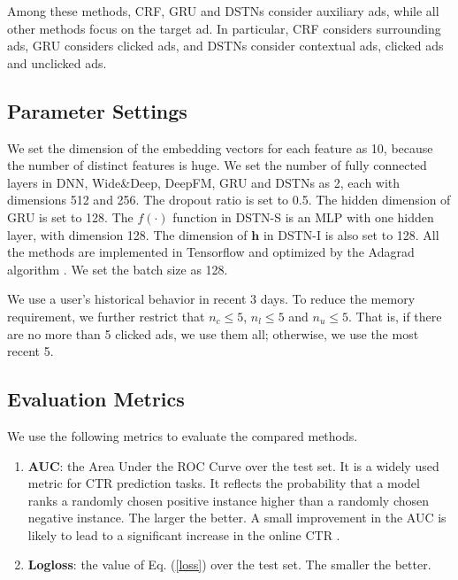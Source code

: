 \documentclass[sigconf]{acmart}
\begin{document}
Among these methods, CRF, GRU and DSTNs consider auxiliary ads, while all other methods focus on the target ad. In particular, CRF considers surrounding ads, GRU considers clicked ads, and DSTNs consider contextual ads, clicked ads and unclicked ads.

\subsection{Parameter Settings}
We set the dimension of the embedding vectors for each feature as 10, because the number of distinct features is huge.
We set the number of fully connected layers in DNN, Wide\&Deep, DeepFM, GRU and DSTNs as 2, each with dimensions 512 and 256. The dropout ratio is set to 0.5. The hidden dimension of GRU is set to 128. The $f(\cdot)$ function in DSTN-S is an MLP with one hidden layer, with dimension 128. The dimension of $\mathbf{h}$ in DSTN-I is also set to 128. All the methods are implemented in Tensorflow and optimized by the Adagrad algorithm \cite{duchi2011adaptive}. We set the batch size as 128.

We use a user's historical behavior in recent 3 days. To reduce the memory requirement, we further restrict that $n_c \leq 5$, $n_l \leq 5$ and $n_u \leq 5$. That is, if there are no more than 5 clicked ads, we use them all; otherwise, we use the most recent 5.

\subsection{Evaluation Metrics}
We use the following metrics to evaluate the compared methods.
\begin{enumerate}
\item \textbf{AUC}: the Area Under the ROC Curve over the test set. It is a widely used metric for CTR prediction tasks. It reflects the probability that a model ranks a randomly chosen positive instance higher than a randomly chosen negative instance. The larger the better. A small improvement in the AUC is likely to lead to a significant increase in the online CTR \cite{cheng2016wide}.
\item \textbf{Logloss}: the value of Eq. (\ref{loss}) over the test set. The smaller the better.
\end{enumerate}
\end{document}

